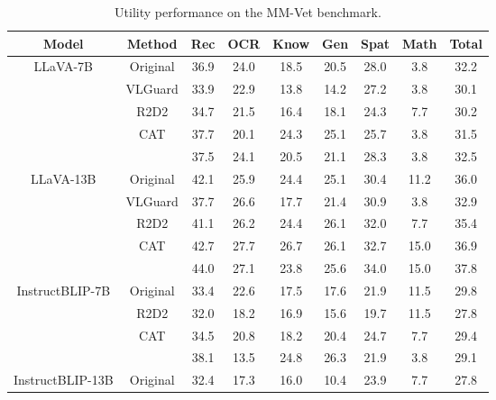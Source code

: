 \begin{table*}[t]
\centering
\caption{Utility performance on the MM-Vet benchmark.}
\begin{tabular}{c|c|ccccccc}
\toprule
Model&Method    & Rec & OCR  & Know & Gen  & Spat & Math & Total \\ \midrule
\multirow{5}{*}{LLaVA-7B}&Original      & 36.9 & 24.0 & 18.5 & 20.5 & 28.0 & 3.8  & 32.2  \\
&VLGuard  & 33.9 & 22.9 & 13.8 & 14.2 & 27.2 & 3.8  & 30.1  \\
&R2D2     & 34.7 & 21.5 & 16.4 & 18.1 & 24.3 & 7.7  & 30.2  \\
&CAT    & 37.7 & 20.1 & 24.3 & 25.1 & 25.7 & 3.8  & 31.5  \\
&\cellcolor{gray!15}{\name} & \cellcolor{gray!15}37.5 & \cellcolor{gray!15}24.1 & \cellcolor{gray!15}20.5 & \cellcolor{gray!15}21.1 & \cellcolor{gray!15}28.3 & \cellcolor{gray!15}3.8  & \cellcolor{gray!15}32.5 \\ \hline \hline
\multirow{5}{*}{LLaVA-13B}&Original      & 42.1 & 25.9 & 24.4 & 25.1 & 30.4 & 11.2 & 36.0 \\
&VLGuard  & 37.7 & 26.6 & 17.7 & 21.4 & 30.9 & 3.8  & 32.9 \\
&R2D2     & 41.1 & 26.2 & 24.4 & 26.1 & 32.0 & 7.7  & 35.4 \\
&CAT    & 42.7 & 27.7 & 26.7 & 26.1 & 32.7 & 15.0 & 36.9 \\
&\cellcolor{gray!15}{\name} & \cellcolor{gray!15}44.0 & \cellcolor{gray!15}27.1 & \cellcolor{gray!15}23.8 & \cellcolor{gray!15}25.6 & \cellcolor{gray!15}34.0 & \cellcolor{gray!15}15.0 & \cellcolor{gray!15}37.8 
\\ \hline \hline
\multirow{4}{*}{InstructBLIP-7B}
&Original & 33.4  &22.6  &17.5  &17.6 &21.9 &11.5  &29.8 \\
&R2D2     & 32.0 &18.2  &16.9  &15.6  &19.7  &11.5 &27.8 \\
&CAT    & 34.5 &20.8  &18.2  &20.4  &24.7  &7.7  &29.4 \\
&\cellcolor{gray!15}{\name} & \cellcolor{gray!15}38.1 &\cellcolor{gray!15}13.5  &\cellcolor{gray!15}24.8  &\cellcolor{gray!15}26.3  &\cellcolor{gray!15}21.9  &\cellcolor{gray!15}3.8  &\cellcolor{gray!15}29.1  
\\ \hline \hline
\multirow{4}{*}{InstructBLIP-13B}
&Original & 32.4 &17.3 &16.0 &10.4 &23.9 &7.7  &27.8 \\

\end{tabular}
\end{table*}
